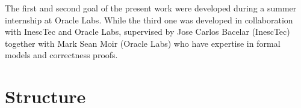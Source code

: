 \vspace{5mm}
The first and second goal of the present work were developed during a summer internship at Oracle Labs. While the third one was developed in collaboration with InescTec and Oracle Labs,
supervised by Jose Carlos Bacelar (InescTec) together with Mark Sean Moir (Oracle Labs) who have
expertise in formal models and correctness proofs.

\section{Structure}




